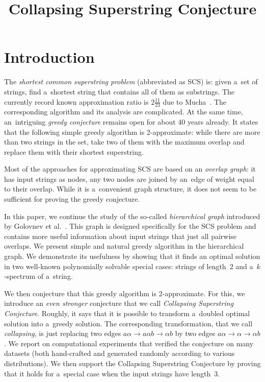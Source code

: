\documentclass[11pt,letterpaper]{article}
\begin{document}
\sloppy
\author{}
\title{Collapsing Superstring Conjecture}
\maketitle

\section{Introduction}
The {\em shortest common superstring problem} (abbreviated as SCS) is:
given a~set of strings, find a~shortest string that contains all of them as
substrings. The currently record known approximation ratio is 
$2\frac{11}{23}$ due to Mucha~\cite{}.
The corresponding algorithm and its analysis are complicated.
At the same time, an~intriguing {\em greedy conjecture} remains open
for about 40 years already. It states that the following simple 
greedy algorithm is 2-approximate: while there are more than two strings 
in the set, take two of them with the maximum overlap and replace them
with their shortest superstring.

Most of the approaches for approximating SCS are based on an
{\em overlap graph}: it has input strings as nodes, any two nodes 
are joined by an~edge of weight equal to their overlap.  
While it is a~convenient graph structure, it does not seem to be sufficient
for proving the greedy conjecture.

In this paper, we continue the study of the so-called {\em hierarchical graph}
introduced by Golovnev et al.~\cite{}. This graph is designed specifically 
for the SCS problem and contains more useful information about input strings
that just all pairwise overlaps. We present simple and natural greedy algorithm
in the hierarchical graph. 
We demonstrate its usefulness by showing that it finds an optimal solution 
in two well-known polynomially solvable special cases: strings of length~2 and
a~$k$-spectrum of a~string.

We then conjecture that this greedy algorithm is 2-approximate. For this, we introduce an {\em even stronger} conjecture that we call 
{\em Collapsing Superstring Conjecture}. 
Roughly, it says that it is possible to transform a~doubled optimal 
solution into a~greedy solution. 
The corresponding transformation, that we call {\em collapsing}, 
is just replacing two edges $a\alpha \to a\alpha b \to \alpha b$ 
by two edges $a\alpha \to \alpha \to \alpha b$. 
We report on computational experiments that verified the 
conjecture on many datasets (both hand-crafted and generated randomly
according to various distributions). 
We then support the Collapsing Superstring Conjecture by 
proving that it holds for a~special case when the input strings have length~3.
\end{document}
